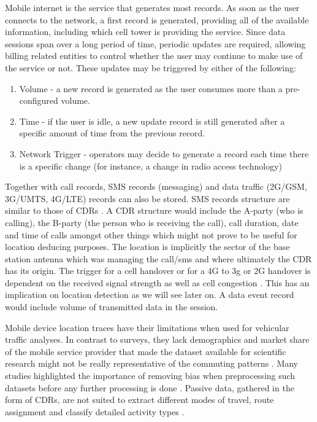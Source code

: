 \documentclass[12pt, a4paper]{report}
\theoremstyle{definition}
\theoremstyle{definition}%
\theoremstyle{definition}%
\theoremstyle{definition}%
\theoremstyle{definition}%
\theoremstyle{definition}%
\begin{document}
Mobile internet is the service that generates most records. As soon as the user connects to the network, a first record is generated, providing all of the available information, including which cell tower is providing the service. Since data sessions span over a long period of time, periodic updates are required, allowing billing related entities to control whether the user may continue to make use of the service or not. These updates may be triggered by either of the following:
\begin{enumerate}
\item Volume - a new record is generated as the user consumes more than a pre-configured volume.
\item Time - if the user is idle, a new update record is still generated after a specific amount of time from the previous record.
\item Network Trigger - operators may decide to generate a record each time there is a specific change (for instance, a change in radio access technology)
\end{enumerate}
	
Together with call records, SMS records (messaging) and data traffic (2G/GSM, 3G/UMTS, 4G/LTE) records can also be stored. SMS records structure are similar to those of CDRs \cite{Calabrese2013}. A CDR structure would include the A-party (who is calling), the B-party (the person who is receiving the call), call duration, date and time of calls amongst other things which might not prove to be useful for location deducing purposes. The location is implicitly the sector of the base station antenna which was managing the call/sms and where ultimately the CDR has its origin. The trigger for a cell handover or for a 4G to 3g or 2G handover is dependent on the received signal strength as well as cell congestion \cite{Liu2014}. This has an implication on location detection as we will see later on. A data event record would include volume of transmitted data in the session.

Mobile device location traces have their limitations when used for vehicular traffic analyses. In contrast to surveys, they lack demographics \cite{Calabrese2013,Colak2015} and market share of the mobile service provider that made the dataset available for scientific research might not be really representative of the commuting patterns \cite{Calabrese2011}. Many studies highlighted the importance of removing bias when preprocessing such datasets before any further processing is done \cite{Iqbal2014,Toole2015}.  Passive data, gathered in the form of CDRs, are not suited to extract different modes of travel, route assignment and classify detailed activity types \cite{Colak2015}.
\end{document}
